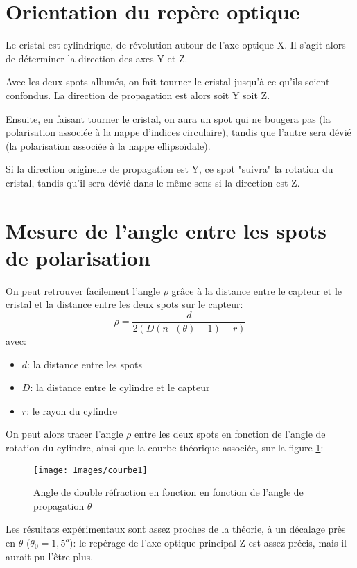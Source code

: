 \documentclass[a4paper,11pt]{report}
\begin{document}
\section{Orientation du repère optique}
Le cristal est cylindrique, de révolution autour de l'axe optique X. Il s'agit alors de déterminer la direction des axes Y et Z.

Avec les deux spots allumés, on fait tourner le cristal jusqu'à ce qu'ils soient confondus. La direction de propagation est alors soit Y soit Z.

Ensuite, en faisant tourner le cristal, on aura un spot qui ne bougera pas (la polarisation associée à la nappe d'indices circulaire), tandis que l'autre sera dévié (la polarisation associée à la nappe ellipsoïdale).

Si la direction originelle de propagation est Y, ce spot "suivra" la rotation du cristal, tandis qu'il sera dévié dans le même sens si la direction est Z.

\section{Mesure de l'angle entre les spots de polarisation}
On peut retrouver facilement l'angle $\rho$ grâce à la distance entre le capteur et le cristal et la distance entre les deux spots sur le capteur: 
\[  \rho = \frac{d}{2(D(n^+(\theta)-1)-r)} \]
avec:
\begin{itemize}
    \item $d$: la distance entre les spots
    \item $D$: la distance entre le cylindre et le capteur
    \item $r$: le rayon du cylindre
\end{itemize}
\vspace*{0.5cm}
On peut alors tracer l'angle $\rho$ entre les deux spots en fonction de l'angle de rotation du cylindre, ainsi que la courbe théorique associée, sur la figure \ref{courbe1}:

\begin{figure}[h]
    \begin{center}
        \texttt{[image: Images/courbe1]}
        \caption{Angle de double réfraction en fonction en fonction de l'angle de propagation $\theta$}
        \label{courbe1}
    \end{center}
\end{figure}

Les résultats expérimentaux sont assez proches de la théorie, à un décalage près en $\theta$ ($\theta_0 = 1,5^o$): le repérage de l'axe optique principal Z est assez précis, mais il aurait pu l'être plus.
\end{document}
